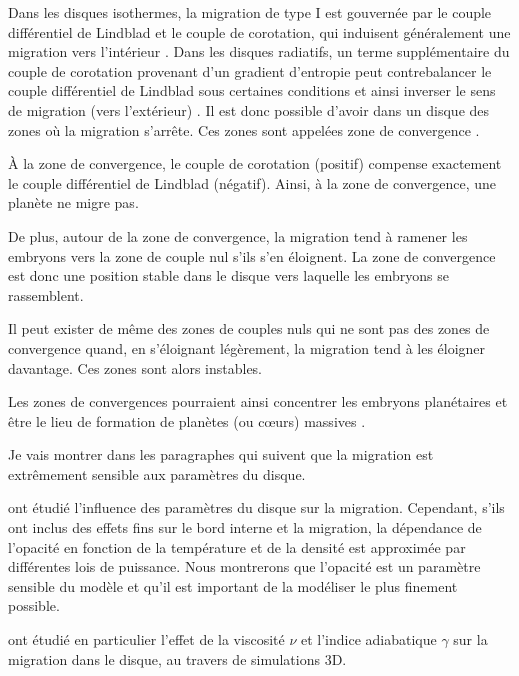 Dans les disques isothermes, la migration de type I est gouvernée par le couple différentiel de Lindblad et le couple de corotation, qui induisent généralement
une migration vers l'intérieur \citep{goldreich1980disk, ward1986density, tanaka2002three}. Dans les disques radiatifs, un terme supplémentaire du couple de corotation provenant d'un gradient d'entropie peut contrebalancer le couple
différentiel de Lindblad sous certaines conditions et ainsi inverser le sens de migration (vers l'extérieur)
\citep{paardekooper2006halting, kley2008migration}. Il est donc possible d'avoir dans un disque des zones où la migration
s'arrête. Ces zones sont appelées zone de convergence \citep[CZs;][]{lyra2010orbital,
paardekooper2011torque, hellary2012global}. 

\bigskip

À la zone de convergence, le couple de corotation (positif) compense exactement le couple différentiel de Lindblad (négatif).
Ainsi, à la zone de convergence, une planète ne migre pas.

De plus, autour de la zone de convergence, la migration tend à ramener les embryons vers la zone de couple nul s'ils s'en
éloignent. La zone de convergence est donc une position stable dans le disque vers laquelle les embryons se rassemblent.

Il peut exister de même des zones de couples nuls qui ne sont pas des zones de convergence quand, en s'éloignant légèrement, la
migration tend à les éloigner davantage. Ces zones sont alors instables.

Les zones de convergences pourraient ainsi concentrer les embryons planétaires et être le lieu de formation de planètes (ou
cœurs) massives \citep{lyra2010orbital, horn2012orbital}. 

\bigskip

Je vais montrer dans les paragraphes qui suivent que la migration est extrêmement sensible aux paramètres du disque.

\cite{kretke2012importance} ont étudié l'influence des paramètres du disque sur la migration. Cependant, s'ils ont inclus des
effets fins sur le bord interne et la migration, la dépendance de l'opacité en fonction de la température et de la densité est
approximée par différentes lois de puissance. Nous montrerons que l'opacité est un paramètre sensible du modèle et qu'il est
important de la modéliser le plus finement possible. 

\cite{bitsch2013influence} ont étudié en particulier l'effet de la viscosité $\nu$ et l'indice adiabatique $\gamma$ sur la
migration dans le disque, au travers de simulations 3D. 

